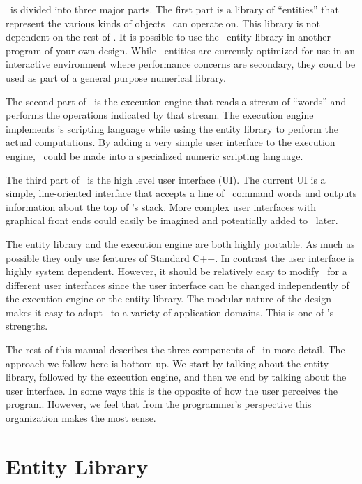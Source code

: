 \documentclass{report}
\begin{document}
\CLAC\ is divided into three major parts. The first part is a library of ``entities'' that
represent the various kinds of objects \CLAC\ can operate on. This library is not dependent on
the rest of \CLAC. It is possible to use the \CLAC\ entity library in another program of your
own design. While \CLAC\ entities are currently optimized for use in an interactive environment
where performance concerns are secondary, they could be used as part of a general purpose
numerical library.

The second part of \CLAC\ is the execution engine that reads a stream of ``words'' and performs
the operations indicated by that stream. The execution engine implements \CLAC's scripting
language while using the entity library to perform the actual computations. By adding a very
simple user interface to the execution engine, \CLAC\ could be made into a specialized numeric
scripting language.

The third part of \CLAC\ is the high level user interface (UI). The current UI is a simple,
line-oriented interface that accepts a line of \CLAC\ command words and outputs information
about the top of \CLAC's stack. More complex user interfaces with graphical front ends could
easily be imagined and potentially added to \CLAC\ later.

The entity library and the execution engine are both highly portable. As much as possible they
only use features of Standard C++. In contrast the user interface is highly system dependent.
However, it should be relatively easy to modify \CLAC\ for a different user interfaces since the
user interface can be changed independently of the execution engine or the entity library. The
modular nature of the design makes it easy to adapt \CLAC\ to a variety of application domains.
This is one of \CLAC's strengths.

The rest of this manual describes the three components of \CLAC\ in more detail. The approach we
follow here is bottom-up. We start by talking about the entity library, followed by the
execution engine, and then we end by talking about the user interface. In some ways this is the
opposite of how the user perceives the program. However, we feel that from the programmer's
perspective this organization makes the most sense.

\chapter{Entity Library}
\end{document}
